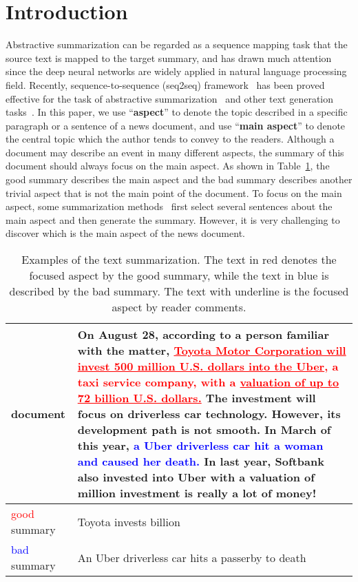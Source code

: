 \documentclass[letterpaper]{article} \usepackage{aaai19}  \usepackage{times}  \usepackage{helvet}  \usepackage{courier}
\begin{document}
    \section{Introduction}

Abstractive summarization can be regarded as a sequence mapping task that the source text is mapped to the target summary, and has drawn much attention since the deep neural networks are widely applied in natural language processing field.
Recently, sequence-to-sequence (seq2seq) framework~\cite{Sutskever2014SequenceTS} has been proved effective for the task of abstractive summarization~\cite{Chopra2016AbstractiveSS,see2017get} and other text generation tasks~\cite{Tao2018GetTP,Gao2019Product}.
In this paper, we use ``\textbf{aspect}'' to denote the topic described in a specific paragraph or a sentence of a news document, and use ``\textbf{main aspect}'' to denote the central topic which the author tends to convey to the readers.
Although a document may describe an event in many different aspects, the summary of this document should always focus on the main aspect.
As shown in Table~\ref{tab:intro-case}, the good summary describes the main aspect and the bad summary describes another trivial aspect that is not the main point of the document.
To focus on the main aspect, some summarization methods~\cite{Sun2018AUM,Zhou2017SelectiveEF,Bansal2018FastAS} first select several sentences about the main aspect and then generate the summary.
However, it is very challenging to discover which is the main aspect of the news document.

\begin{table}[t]
\centering
\caption{Examples of the text summarization. The text in red denotes the focused aspect by the good summary, while the text in blue is described by the bad summary. The text with underline is the focused aspect by reader comments.} \scriptsize
\begin{tabular}{l|l}
\toprule
document & \multicolumn{1}{p{6cm}}{
On August 28, according to a person familiar with the matter, \textcolor{red}{\ul{Toyota Motor Corporation will invest 500 million U.S. dollars into the Uber}, a taxi service company, with a \ul{valuation of up to 72 billion U.S. dollars.}} 
The investment will focus on driverless car technology.
However, its development path is not smooth.
In March of this year, \textcolor{blue}{a Uber driverless car hit a woman and caused her death.}
In last year, Softbank also invested into Uber with a valuation of \500 million investment is really a lot of money!}      \\ \hline
\textcolor{red}{good} summary                                     & \multicolumn{1}{p{6cm}}{Toyota invests \72 billion}   \\ \hline 
\textcolor{blue}{bad} summary                                     & \multicolumn{1}{p{6cm}}{An Uber driverless car hits a passerby to death}   \\
\bottomrule
\end{tabular}
\label{tab:intro-case}
\end{table}
\end{document}
